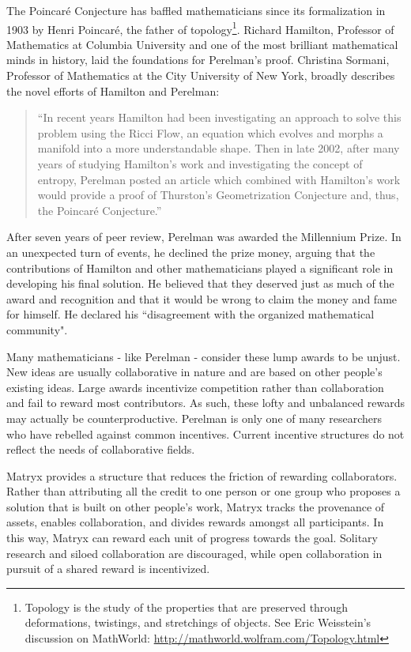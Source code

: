 \documentclass[a4paper, 10pt, conference]{ieeeconf}      %
\begin{document}
The Poincaré Conjecture has baffled mathematicians since its formalization in 1903 by Henri Poincaré, the father of topology\footnote{Topology is the study of the properties that are preserved through deformations, twistings, and stretchings of objects. See Eric Weisstein's discussion on MathWorld: \href{http://mathworld.wolfram.com/Topology.html}{http://mathworld.wolfram.com/Topology.html}}. 
Richard Hamilton, Professor of Mathematics at Columbia University and one of the most brilliant mathematical minds in history, laid the foundations for Perelman's proof. 
Christina Sormani, Professor of Mathematics at the City University of New York, broadly describes the novel efforts \cite{sormani} of Hamilton and Perelman:
\begin{quote}
“In recent years Hamilton had been investigating an approach to solve this problem using the Ricci Flow, an equation which evolves and morphs a manifold into a more understandable shape. Then in late 2002, after many years of studying Hamilton’s work and investigating the concept of entropy, Perelman posted an article which combined with Hamilton’s work would provide a proof of Thurston’s Geometrization Conjecture and, thus, the Poincaré  Conjecture.” 
\end{quote}

After seven years of peer review, Perelman was awarded the Millennium Prize. 
In an unexpected turn of events, he declined the prize money, arguing that the contributions of Hamilton and other mathematicians played a significant role in developing his final solution. 
He believed that they deserved just as much of the award and recognition and that it would be wrong to claim the money and fame for himself. 
He declared his ``disagreement with the organized mathematical community"\cite{ritter2010}.

Many mathematicians - like Perelman - consider these lump awards to be unjust. 
New ideas are usually collaborative in nature and are based on other people's existing ideas.
Large awards incentivize competition rather than collaboration and fail to reward most contributors. As such, these lofty and unbalanced rewards may actually be counterproductive. 
Perelman is only one of many researchers who have rebelled against common incentives. 
Current incentive structures do not reflect the needs of collaborative fields. 

Matryx provides a structure that reduces the friction of rewarding collaborators. 
Rather than attributing all the credit to one person or one group who proposes a solution that is built on other people’s work, Matryx tracks the provenance of assets, enables collaboration, and divides rewards amongst all participants. 
In this way, Matryx can reward each unit of progress towards the goal. 
Solitary research and siloed collaboration are discouraged, while open collaboration in pursuit of a shared reward is incentivized.
\end{document}
